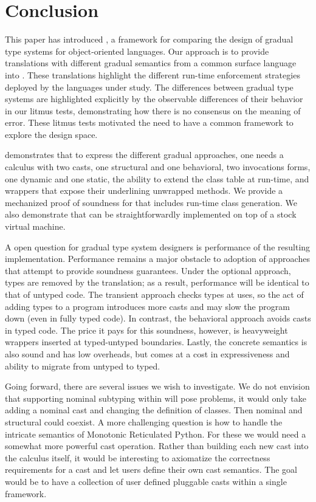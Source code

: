 \documentclass[USenglish]{tex/lipics-v2016}
\begin{document}
\section{Conclusion}

This paper has introduced \kafka, a framework for comparing the design of
gradual type systems for object-oriented languages. Our approach is to provide
translations with different gradual semantics from a common surface language
into \kafka. These translations highlight the different run-time enforcement
strategies deployed by the languages under study. The differences between
gradual type systems are highlighted explicitly by the observable differences
of their behavior in our litmus tests, demonstrating how there is no consensus
on the meaning of error.  These litmus tests motivated the need to have a
common framework to explore the design space.

\kafka demonstrates that to express the different gradual approaches, one
needs a calculus with two casts, one structural and one behavioral, two
invocations forms, one dynamic and one static, the ability to extend the
class table at run-time, and wrappers that expose their underlining
unwrapped methods.  We provide a mechanized proof of soundness for \kafka
that includes run-time class generation.  We also demonstrate that \kafka
can be straightforwardly implemented on top of a stock virtual machine.

A open question for gradual type system designers is performance of the
resulting implementation. Performance remains a major obstacle to adoption
of approaches that attempt to provide soundness guarantees.  Under the
optional approach, types are removed by the translation; as a result,
performance will be identical to that of untyped code.  The transient
approach checks types at uses, so the act of adding types to a program
introduces more casts and may slow the program down (even in fully typed code). 
In contrast, the behavioral approach avoids casts in
typed code. The price it pays for this soundness, however, is heavyweight
wrappers inserted at typed-untyped boundaries.  Lastly, the concrete
semantics is also sound and has low overheads, but comes at a cost in
expressiveness and ability to migrate from untyped to typed.

Going forward, there are several issues we wish to investigate.  We do not
envision that supporting nominal subtyping within \kafka will pose problems,
it would only take adding a nominal cast and changing the definition of
classes. Then nominal and structural could coexist. A more challenging
question is how to handle the intricate semantics of Monotonic Reticulated
Python. For these we would need a somewhat more powerful cast operation.
Rather than building each new cast into the calculus itself, it would be
interesting to axiomatize the correctness requirements for a cast and let
users define their own cast semantics. The goal would be to have a
collection of user defined pluggable casts within a single framework.
\end{document}
